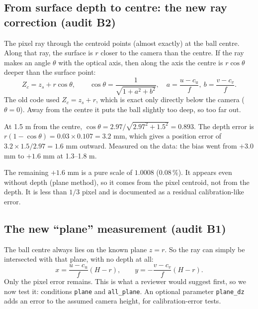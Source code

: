 \documentclass[11pt,a4paper]{article}
\begin{document}
\subsection{From surface depth to centre: the new ray correction (audit B2)}
The pixel ray through the centroid points (almost exactly) at the ball centre. Along that ray, the surface is $r$ closer
to the camera than the centre. If the ray makes an angle $\theta$ with the optical axis, then along the axis the centre is
$r\cos\theta$ deeper than the surface point:
\[ Z_c = z_s + r\cos\theta,\qquad \cos\theta = \frac{1}{\sqrt{1+a^2+b^2}},\quad a=\frac{u-c_u}{f},\ b=\frac{v-c_v}{f}. \]
The old code used $Z_c = z_s + r$, which is exact only directly below the camera ($\theta=0$). Away from the centre it puts
the ball slightly too deep, so too far out.

\begin{example}
At 1.5 m from the centre, $\cos\theta = 2.97/\sqrt{2.97^2+1.5^2} = 0.893$. The depth error is
$r(1-\cos\theta)=0.03\times0.107=3.2$ mm, which gives a position error of $3.2\times1.5/2.97 = 1.6$ mm outward.
Measured on the data: the bias went from $+3.0$ mm to $+1.6$ mm at 1.3--1.8 m.

The remaining $+1.6$ mm is a pure scale of $1.0008$ (0.08\,\%). It appears even without depth (plane method), so it comes
from the pixel centroid, not from the depth. It is less than $1/3$ pixel and is documented as a residual
calibration-like error.
\end{example}

\subsection{The new ``plane'' measurement (audit B1)}
The ball centre always lies on the known plane $z=r$. So the ray can simply be intersected with that plane, with no
depth at all:
\[ x = \frac{u-c_u}{f}(H-r),\qquad y = -\frac{v-c_v}{f}(H-r). \]
Only the pixel error remains. This is what a reviewer would suggest first, so we now test it: conditions
\texttt{plane} and \texttt{all\_plane}. An optional parameter \texttt{plane\_dz} adds an error to the assumed camera
height, for calibration-error tests.
\end{document}
